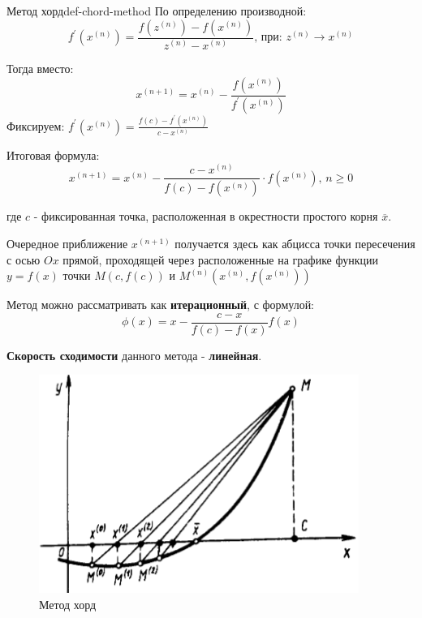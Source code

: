\documentclass[14pt]{extarticle}
\begin{document}
    \begin{definition}{Метод хорд}{def-chord-method}
        По определению производной:
        $$f^{'}(x^{(n)}) = \frac{f(z^{(n)}) - f(x^{(n)})}{z^{(n)} - x^{(n)}} \text{, при: } z^{(n)} \to x^{(n)}$$
        
        Тогда вместо:
        $$x^{(n + 1)} = x^{(n)} - \frac{f(x^{(n)})}{f^{'}(x^{(n)})}$$
        Фиксируем: $f^{'}(x^{(n)}) = \frac{f(c) - f^{'}(x^{(n)})}{c - x^{(n)}}$

        Итоговая формула:
        $$x^{(n + 1)} = x^{(n)} - \frac{c - x^{(n)}}{f(c) - f(x^{(n)})} \cdot f(x^{(n)}) \text{, } n \geq 0$$
        
        где $c$ - фиксированная точка, расположенная в окрестности простого корня $\overline{x}$.
    
        \vspace{\baselineskip}
    
        Очередное приближение $x^{(n + 1)}$ получается здесь как абцисса точки пересечения с осью $Ox$ прямой, проходящей через расположенные на графике функции $y = f(x)$ точки $M(c, f(c))$ и $M^{(n)}(x^{(n)}, f(x^{(n)}))$
    
        \vspace{\baselineskip}
    
        Метод можно рассматривать как \textbf{итерационный}, с формулой:
        $$\phi(x) = x - \frac{c - x}{f(c) - f(x)}f(x)$$
    
        \vspace{\baselineskip}

        \textbf{Скорость сходимости} данного метода - \textbf{линейная}.
    \end{definition}

    \begin{figure}[H]
        \centering
        \includegraphics[scale=0.5]{images/chord-method-ex.png}
        \caption{Метод хорд}
        \label{fig:chord-method}
    \end{figure}
\end{document}
